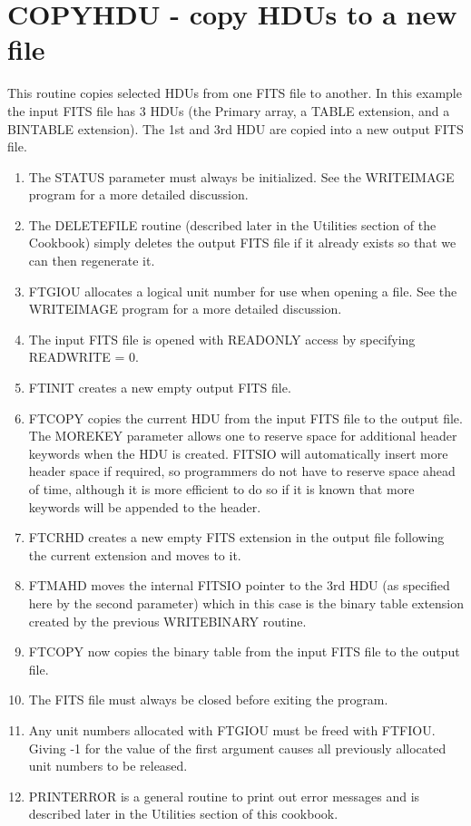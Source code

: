 \section{COPYHDU - copy HDUs to a new file}

This routine copies selected HDUs from one FITS file to another.  In
this example the input FITS file has 3 HDUs (the Primary array, a TABLE
extension, and a BINTABLE extension).   The 1st and 3rd HDU are copied
into a new output FITS file.

\begin{enumerate}
\item
The STATUS parameter must always be initialized.  See the WRITEIMAGE 
program for a more detailed discussion.

\item
The DELETEFILE routine (described later in the Utilities section of the
Cookbook) simply deletes the output FITS file if it already exists so
that we can then regenerate it.
\item
FTGIOU allocates a logical unit number for use when opening a file.
See the WRITEIMAGE program for a more detailed discussion.
\item
The input FITS file is opened with READONLY access by specifying READWRITE = 0.
\item
FTINIT creates a new empty output FITS file.
\item
FTCOPY copies the current HDU from the input FITS file to the output
file.  The MOREKEY parameter allows one to reserve space for additional
header keywords when the HDU is created.   FITSIO will automatically
insert more header space if required, so programmers do not have to
reserve space ahead of time, although it is more efficient to do so if
it is known that more keywords will be appended to the header.

\item
FTCRHD creates a new empty FITS extension in the output file following the
current extension and moves to it. 
\item
FTMAHD moves the internal FITSIO pointer to the 3rd HDU (as specified
here by the second parameter) which in this case is the binary table
extension created by the previous WRITEBINARY routine.
\item
FTCOPY now copies the binary table from the input FITS file to the output file.
\item
The FITS file must always be closed before exiting the program. 
\item
Any unit numbers allocated with FTGIOU must be freed with FTFIOU. Giving
-1 for the value of the first argument causes all previously allocated
unit numbers to be released.
\item
PRINTERROR is a general routine to print out error messages and is
described later in the Utilities section of this cookbook.
\end{enumerate}

